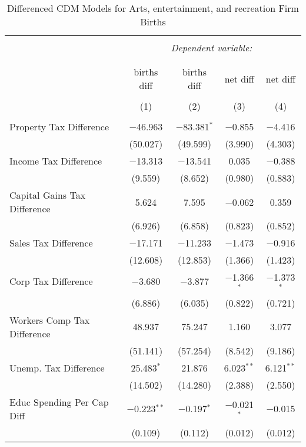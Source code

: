 
\begin{table}[!htbp] \centering 
  \caption{Differenced CDM Models for  Arts, entertainment, and recreation Firm Births} 
  \label{} 
\begin{tabular}{@{\extracolsep{5pt}}lcccc} 
\\[-1.8ex]\hline 
\hline \\[-1.8ex] 
 & \multicolumn{4}{c}{\textit{Dependent variable:}} \\ 
\cline{2-5} 
\\[-1.8ex] & \multicolumn{4}{c}{ } \\ 
 & births diff & births diff & net diff & net diff \\ 
\\[-1.8ex] & (1) & (2) & (3) & (4)\\ 
\hline \\[-1.8ex] 
 Property Tax Difference & $-$46.963 & $-$83.381$^{*}$ & $-$0.855 & $-$4.416 \\ 
  & (50.027) & (49.599) & (3.990) & (4.303) \\ 
  Income Tax Difference & $-$13.313 & $-$13.541 & 0.035 & $-$0.388 \\ 
  & (9.559) & (8.652) & (0.980) & (0.883) \\ 
  Capital Gains Tax Difference & 5.624 & 7.595 & $-$0.062 & 0.359 \\ 
  & (6.926) & (6.858) & (0.823) & (0.852) \\ 
  Sales Tax Difference & $-$17.171 & $-$11.233 & $-$1.473 & $-$0.916 \\ 
  & (12.608) & (12.853) & (1.366) & (1.423) \\ 
  Corp Tax Difference & $-$3.680 & $-$3.877 & $-$1.366$^{*}$ & $-$1.373$^{*}$ \\ 
  & (6.886) & (6.035) & (0.822) & (0.721) \\ 
  Workers Comp Tax Difference & 48.937 & 75.247 & 1.160 & 3.077 \\ 
  & (51.141) & (57.254) & (8.542) & (9.186) \\ 
  Unemp. Tax Difference & 25.483$^{*}$ & 21.876 & 6.023$^{**}$ & 6.121$^{**}$ \\ 
  & (14.502) & (14.280) & (2.388) & (2.550) \\ 
  Educ Spending Per Cap Diff & $-$0.223$^{**}$ & $-$0.197$^{*}$ & $-$0.021$^{*}$ & $-$0.015 \\ 
  & (0.109) & (0.112) & (0.012) & (0.012) \\ 

\end{tabular}
\end{table}
